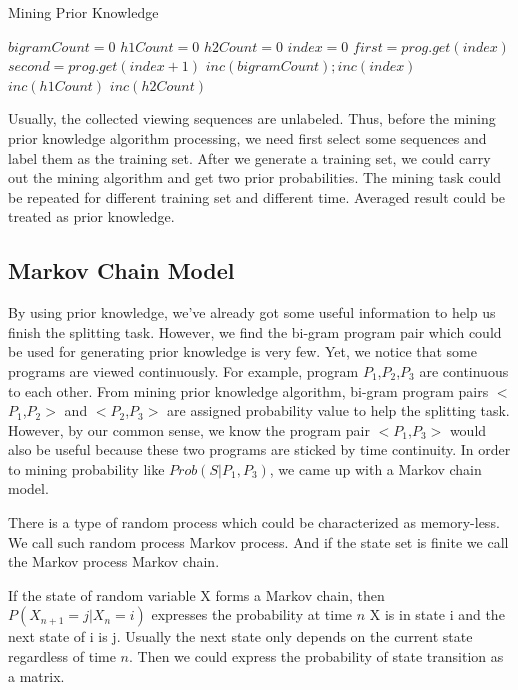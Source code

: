 \begin{algorithm}[htb]
\caption{Mining Prior Knowledge}
\label{code:2}
\begin{algorithmic}[1]
\STATE $bigramCount = 0$
\STATE $h1Count=0$
\STATE $h2Count=0$
\STATE $index=0$
\STATE $first=prog.get(index)$
\STATE $second = prog.get(index+1)$
\STATE $inc(bigramCount);inc(index)$
\STATE $inc(h1Count)$
\STATE $inc(h2Count)$
\ENDIF
\ENDIF
\ENDWHILE
\end{algorithmic}
\end{algorithm}

Usually, the collected viewing sequences are unlabeled. Thus, before the mining prior knowledge algorithm processing, we need
first select some sequences and label them as the training set. After we generate a training set, we could carry out the mining
algorithm and get two prior probabilities. The mining task could be repeated for different training set and different time.
Averaged result could be treated as prior knowledge.

\subsection{Markov Chain Model}
By using prior knowledge, we've already got some useful information to help us finish the splitting task.
However, we find the bi-gram program pair which could be used for generating prior knowledge is very few.
Yet, we notice that some programs are viewed continuously. For example, program $P_1$,$P_2$,$P_3$ are continuous
to each other. From mining prior knowledge algorithm, bi-gram program pairs $<$$P_1$,$P_2$$>$ and $<$$P_2$,$P_3$$>$ are
assigned probability value to help the splitting task. However, by our common sense, we know the program pair
$<$$P_1$,$P_3$$>$ would also be useful because these two programs are sticked by time continuity. In order to mining
probability like $Prob(S|P_1,P_3)$, we came up with a Markov chain model\cite{1003838}\cite{18626}\cite{1165342}\cite{Baier:2003:MAC:1435631.859038}.

There is a type of random process which could be characterized as memory-less. We call such random process Markov process.
And if the state set is finite we call the Markov process Markov chain.

If the state of random variable X forms a Markov chain, then $P{(X_{n+1}=j|X_n=i)}$ expresses the probability at time $n$ X
is in state i and the next state of i is j. Usually the next state only depends on the current state regardless of time $n$.
Then we could express the probability of state transition as a matrix.

